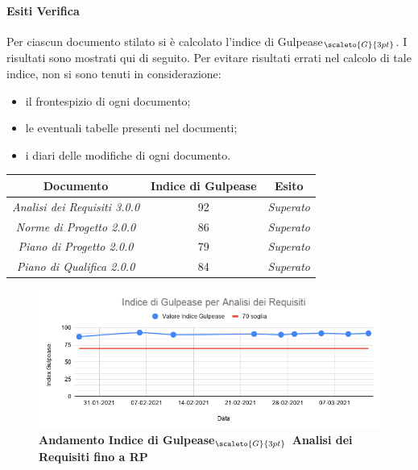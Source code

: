 {{\paragraph{Esiti Verifica} \label{ResocontoAttivitàDiVerificaRevisioneDiProgettazioneVerificheDiProdottoStrategiaPerAnalisiStaticaEsitiVerifica}
Per ciascun documento stilato si è calcolato l’indice di Gulpease$_{\scaleto{G}{3pt}}$. I risultati sono mostrati qui di seguito.
Per evitare risultati errati nel calcolo di tale indice, non si sono tenuti in considerazione:
\begin{itemize}
	\item il frontespizio di ogni documento;
	\item le eventuali tabelle presenti nel documenti;
	\item i diari delle modifiche di ogni documento.
\end{itemize}
\quad
\def\tabularxcolumn#1{m{#1}}
{
	\begin{center}
		\renewcommand{\arraystretch}{1.4}
		\begin{tabularx}{11.50cm}{|c|c|c|}
			\hline
			\rowcolor{airforceblue}
			\textbf{Documento} & \textbf{Indice di Gulpease} & \textbf{Esito}\\
			\hline
			\textit{Analisi dei Requisiti 3.0.0} & 92  & \textit{Superato}\\
			\hline
			\textit{Norme di Progetto 2.0.0} & 86 & \textit{Superato}\\
			\hline
			\textit{Piano di Progetto 2.0.0} & 79 & \textit{Superato}\\
			\hline
			\textit{Piano di Qualifica 2.0.0} & 84 & \textit{Superato}\\
			\hline
		\end{tabularx}
	\end{center}

\begin{figure}[!h]
	\begin{center}
		\includegraphics[width=1\linewidth]{../immagini/gulpeaseRP/IndicediGulpease perAnalisiDeiRequisiti.png}
		\caption{\textbf{Andamento Indice di Gulpease$_{\scaleto{G}{3pt}}$ Analisi dei Requisiti fino a RP}}
	\end{center}
\end{figure}

}}}
